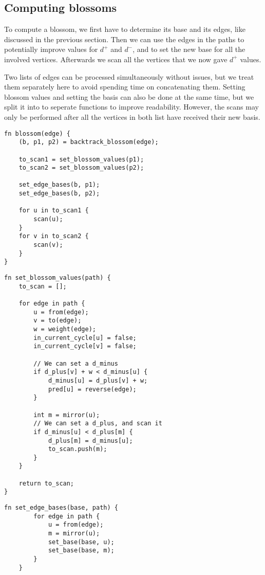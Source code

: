 \subsection{Computing blossoms}
To compute a blossom, we first have to determine its base and its edges, like discussed in the previous section. Then we can use the edges in the paths to potentially improve values for $d^+$ and $d^-$, and to set the new base for all the involved vertices. Afterwards we scan all the vertices that we now gave $d^+$ values.

Two lists of edges can be processed simultaneously without issues, but we treat them separately here to avoid spending time on concatenating them. Setting blossom values and setting the basis can also be done at the same time, but we split it into to seperate functions to improve readability. However, the scans may only be performed after all the vertices in both list have received their new basis.
\begin{lstlisting}[caption={Blossom},label=Listing,mathescape=true]
fn blossom(edge) {
    (b, p1, p2) = backtrack_blossom(edge);

    to_scan1 = set_blossom_values(p1);
    to_scan2 = set_blossom_values(p2);

    set_edge_bases(b, p1);
    set_edge_bases(b, p2);

    for u in to_scan1 {
        scan(u);
    }
    for v in to_scan2 {
        scan(v);
    }
}
\end{lstlisting}

\begin{lstlisting}[caption={Set blossom values},label=Listing,mathescape=true]
fn set_blossom_values(path) {
    to_scan = [];

    for edge in path {
        u = from(edge);
        v = to(edge);
        w = weight(edge);
        in_current_cycle[u] = false;
        in_current_cycle[v] = false;

        // We can set a d_minus
        if d_plus[v] + w < d_minus[u] {
            d_minus[u] = d_plus[v] + w;
            pred[u] = reverse(edge);
        }

        int m = mirror(u);
        // We can set a d_plus, and scan it
        if d_minus[u] < d_plus[m] {
            d_plus[m] = d_minus[u];
            to_scan.push(m);
        }
    }

    return to_scan;
}
\end{lstlisting}

\begin{lstlisting}[caption={Set edge bases},label=Listing,mathescape=true]
    fn set_edge_bases(base, path) {
        for edge in path {
            u = from(edge);
            m = mirror(u);
            set_base(base, u);
            set_base(base, m);
        }
    }
    \end{lstlisting}

